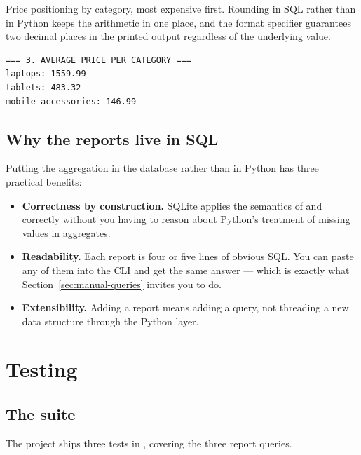 Price positioning by category, most expensive first. Rounding in SQL rather
than in Python keeps the arithmetic in one place, and the
 format specifier guarantees two decimal places in the printed
output regardless of the underlying value.

\begin{codebox}
\noindent
\begin{lstlisting}[style=txt]
=== 3. AVERAGE PRICE PER CATEGORY ===
laptops: 1559.99
tablets: 483.32
mobile-accessories: 146.99
\end{lstlisting}
\end{codebox}

\subsection{Why the reports live in SQL}

Putting the aggregation in the database rather than in Python has three
practical benefits:

\begin{itemize}
  \item \textbf{Correctness by construction.} SQLite applies the
         semantics of  and  correctly
        without you having to reason about Python's treatment of missing
        values in aggregates.
  \item \textbf{Readability.} Each report is four or five lines of obvious
        SQL. You can paste any of them into the  CLI and get
        the same answer --- which is exactly what Section~\ref{sec:manual-queries}
        invites you to do.
  \item \textbf{Extensibility.} Adding a report means adding a query, not
        threading a new data structure through the Python layer.
\end{itemize}

\section{Testing}

\subsection{The suite}

The project ships three tests in ,
covering the three report queries.

